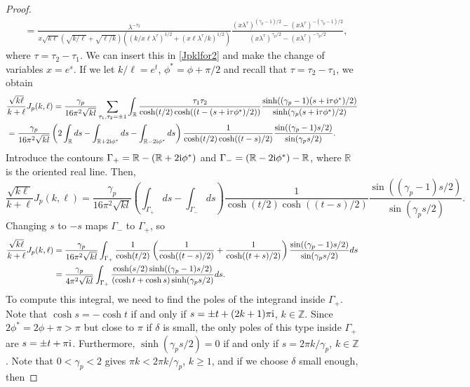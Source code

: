 \documentclass{article}
\numberwithin{equation}{section}
\numberwithin{figure}{section}
\theoremstyle{plain}
\theoremstyle{plain}
\numberwithin{thm}{section}
\theoremstyle{remark}
\newcommand{\R}{\mathbb{R}}
\newcommand{\Z}{\mathbb{Z}}
\newcommand{\I}{{\rm i}}
\let \ge \geqslant
\begin{document}
\begin{proof}
\begin{align*}
&=\frac {\lambda^{-\tau_2}}{x\sqrt{k\ell}(\sqrt{k/\ell}+\sqrt{\ell/k})((k/x\ell\lambda^\tau)^{1/2}+(x\ell\lambda^\tau/k)^{1/2})}
\frac{(x\lambda^\tau)^{(\gamma_p-1)/2}-(x\lambda^\tau)^{-(\gamma_p-1)/2}}{(x\lambda^\tau)^{\gamma_p/2}-(x\lambda^\tau)^{-\gamma_p/2}},
\end{align*}
where $\tau=\tau_2-\tau_1$. We can insert this in \eqref{Jpklfor2} and make the change of variables $x=e^s$. If we let $k/\ell=e^t$, $\phi^*=\phi+\pi/2$ and recall that 
$\tau=\tau_2-\tau_1$, we obtain
\begin{align*}
&\frac{\sqrt{k\ell}}{k+\ell}J_p(k,\ell)=\frac{\gamma_p}{16\pi^2\sqrt{kl}}\sum_{\tau_1,\tau_2=\pm 1}\int_\R
\frac {\tau_1\tau_2}{\cosh(t/2)\cosh((t-(s+\I\tau\phi^*)/2))}\frac{\sinh((\gamma_p-1)(s+\I\tau\phi^*)/2)}{\sinh(\gamma_p(s+\I\tau\phi^*)/2)}\\
&=\frac{\gamma_p}{16\pi^2\sqrt{kl}}\left(2\int_\R ds-\int_{\R+2\I\phi^*} ds-\int_{\R-2\I\phi^*}ds\right) \frac 1{\cosh(t/2)\cosh((t-s)/2)}
\frac{\sin((\gamma_p-1)s/2)}{\sin(\gamma_ps/2)}.
\end{align*}
Introduce the contours $\Gamma_+=\R-(\R+2\I\phi^*)$ and $\Gamma_-=(\R-2\I\phi^*)-\R$, where $\R$ is the oriented real line. Then,
\begin{equation*}
\frac{\sqrt{k\ell}}{k+\ell}J_p(k,\ell)=\frac{\gamma_p}{16\pi^2\sqrt{kl}}\left(\int_{\Gamma_+}ds-\int_{\Gamma_-}ds\right)
\frac 1{\cosh(t/2)\cosh((t-s)/2)}\frac{\sin((\gamma_p-1)s/2)}{\sin(\gamma_ps/2)}.
\end{equation*}
Changing $s$ to $-s$ maps $\Gamma_-$ to $\Gamma_+$, so
\begin{align}\label{Jpklfor3}
\frac{\sqrt{k\ell}}{k+\ell}J_p(k,\ell)&=\frac{\gamma_p}{16\pi^2\sqrt{kl}}\int_{\Gamma_+}\frac 1{\cosh(t/2)}\left(\frac 1{\cosh((t-s)/2)}+\frac 1{\cosh((t+s)/2)}\right)
\frac{\sin((\gamma_p-1)s/2)}{\sin(\gamma_ps/2)}ds\notag\\
&=\frac{\gamma_p}{4\pi^2\sqrt{kl}}\int_{\Gamma_+}\frac{\cosh(s/2)\sinh((\gamma_p-1)s/2)}{(\cosh t+\cosh s)\sinh(\gamma_ps/2)}ds.
\end{align}
To compute this integral, we need to find the poles of the integrand inside $\Gamma_+$. Note that $\cosh s=-\cosh t$ if and only if $s=\pm t+(2k+1)\pi \I$, $k\in\Z$. Since
$2\phi^*=2\phi+\pi>\pi$ but close to $\pi$ if $\delta$ is small, the only poles of this type inside $\Gamma_+$ are $s=\pm t+\pi\I$. Furthermore, $\sinh(\gamma_ps/2)=0$
if and only if $s=2\pi k/\gamma_p$, $k\in\Z$. Note that $0<\gamma_p<2$ gives $\pi k<2\pi k/\gamma_p$, $k\ge 1$, and if we choose $\delta$ small enough, then

\end{proof}
\end{document}
